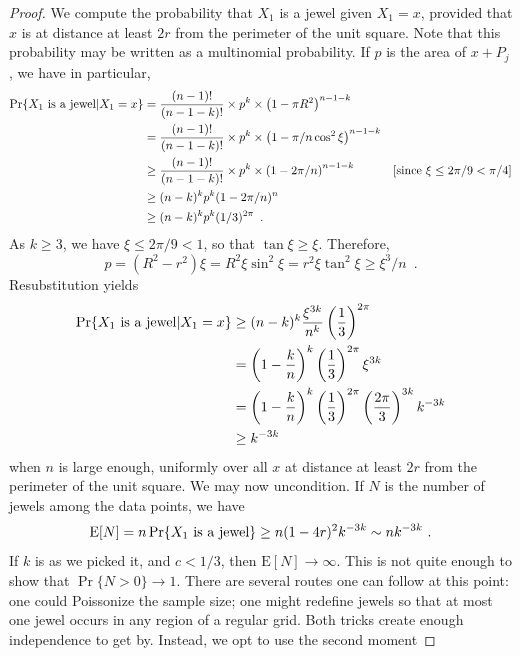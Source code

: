\documentclass[lotsofwhite,charterfonts]{patmorin}
\newcommand{\PROB}{\Pr}
\newcommand{\EXP}{\mathrm{E}}
\begin{document}
\begin{proof}
We compute the probability that $X_1$ is a jewel
given $X_1 = x$, provided that $x$ is at distance at
least $2r$ from the perimeter of the unit square.
Note that this probability may be written as
a multinomial probability. If $p$ is the area
of $x+P_j$, we have in particular,
\[
\begin{aligned}
\PROB \{ X_1 ~\hbox{\rm is a jewel} | X_1 = x \}
&=  {(n-1)! \over (n-1-k)!}\times p^k\times \left( 1 - \pi R^2 \right)^{n-1-k} \\
&=  {(n-1)! \over (n-1-k)!} \times p^k\times  \left( 1 - \pi/n\cos^2\xi \right)^{n-1-k} \\
&\ge  {(n-1)! \over (n-1-k)!} \times p^k\times \left( 1 - 2\pi/n \right)^{n-1-k} & \mbox{[since $\xi \le 2\pi/9 < \pi/4$]} \\
 &\ge  (n-k)^k p^k (1-2\pi/n)^n \\
&\ge  (n-k)^k p^k (1/3)^{2\pi} \enspace . 
\end{aligned}
\]
As $k \ge 3$, we have $\xi \le 2\pi/9 < 1$, so that
$\tan \xi \ge \xi$.
Therefore, 
\[
p = (R^2 - r^2) \xi = R^2 \xi \sin^2 \xi
  = r^2 \xi \tan^2 \xi \ge \xi^3/n \enspace .
\]
Resubstitution yields
\[
\begin{aligned}
\PROB \{ X_1 ~\hbox{\rm is a jewel} | X_1 = x \}
& \ge (n-k)^k {\xi^{3k} \over n^k} \left( {1 \over 3} \right)^{2\pi} \\
& =   \left( 1 - {k \over n} \right)^k  
    \left( {1 \over 3} \right)^{2\pi}
    \xi^{3k} \\
& = \left( 1 - {k \over n} \right)^k  
    \left( {1 \over 3} \right)^{2\pi}
    \left({2\pi\over 3}\right)^{3k} k^{-3k}\\
& \ge k^{-3k}
\end{aligned}
\]
when $n$ is large enough, uniformly over all $x$
at distance at least $2r$ from the perimeter of the unit square.
We may now uncondition. If $N$ is the 
number of jewels among the data points, we have
\[
\EXP[N]
 = n \PROB \{ X_1 ~\hbox{\rm is a jewel} \}
 \ge n (1-4r)^2 k^{-3k}
 \sim n k^{-3k}~.
\]
If $k$ is as we picked it, and $c < 1/3$,
then $\EXP[N] \to \infty$.
This is not quite enough to show that 
$\PROB \{ N > 0 \} \to 1$.
There are several routes one can follow at this
point: one could Poissonize the sample
size; one might redefine jewels so that
at most one jewel occurs in any region of
a regular grid. Both tricks create
enough independence to get by.
Instead, we opt to use the second moment

\end{proof}
\end{document}
